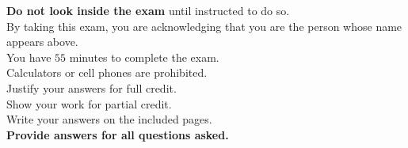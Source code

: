 \documentclass{ximera}
\begin{document}
\vspace{1cm}

{\Large
  \noindent \textbf{Do not look inside the exam} until instructed to do so.\\[1em]
  \noindent By taking this exam, you are acknowledging that you are the person whose name appears above.\\[1em]
\noindent You have $55$ minutes to complete the exam.\\[1em]
\noindent Calculators or cell phones are prohibited.\\[1em]
\noindent Justify your answers for full credit.\\[1em]
\noindent Show your work for partial credit.\\[1em]
\noindent Write your answers on the included pages.\\[1em]
\noindent \textbf{Provide answers for all questions asked.}
}
\end{document}
